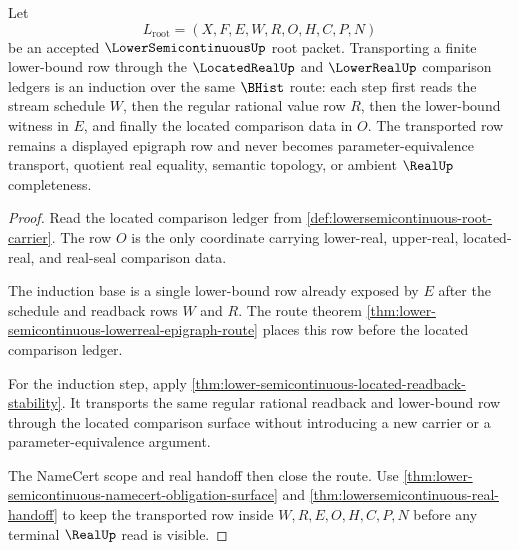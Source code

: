 \begin{theorem}
\label{thm:lowersemicontinuous-located-epigraph-transport-induction}
Let
$$
L_{\mathrm{root}}=(X,F,E,W,R,O,H,C,P,N)
$$
be an accepted $\LowerSemicontinuousUp$ root packet. Transporting a finite lower-bound row through the $\LocatedRealUp$ and $\LowerRealUp$ comparison ledgers is an induction over the same $\BHist$ route: each step first reads the stream schedule $W$, then the regular rational value row $R$, then the lower-bound witness in $E$, and finally the located comparison data in $O$. The transported row remains a displayed epigraph row and never becomes parameter-equivalence transport, quotient real equality, semantic topology, or ambient $\RealUp$ completeness.
\end{theorem}
\begin{proof}
Read the located comparison ledger from \autoref{def:lowersemicontinuous-root-carrier}. The row $O$ is the only coordinate carrying lower-real, upper-real, located-real, and real-seal comparison data.

The induction base is a single lower-bound row already exposed by $E$ after the schedule and readback rows $W$ and $R$. The route theorem \autoref{thm:lower-semicontinuous-lowerreal-epigraph-route} places this row before the located comparison ledger.

For the induction step, apply \autoref{thm:lower-semicontinuous-located-readback-stability}. It transports the same regular rational readback and lower-bound row through the located comparison surface without introducing a new carrier or a parameter-equivalence argument.

The NameCert scope and real handoff then close the route. Use \autoref{thm:lower-semicontinuous-namecert-obligation-surface} and \autoref{thm:lowersemicontinuous-real-handoff} to keep the transported row inside $W,R,E,O,H,C,P,N$ before any terminal $\RealUp$ read is visible.
\end{proof}

